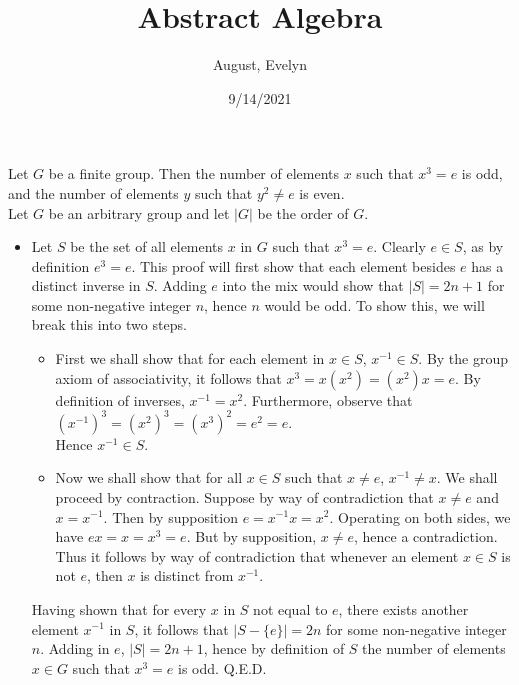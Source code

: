\documentclass{article}
\title{Abstract Algebra}
\author{August, Evelyn}
\date{9/14/2021}
\begin{document}
 Let $G$ be a finite group. Then the number of elements $x$ such that $x^3 = e$ is odd, and the number of elements $y$ such that $y^2 \ne e$ is even.\\

 Let $G$ be an arbitrary group and let $|G|$ be the order of $G$. 
\begin{itemize}
    \item Let $S$ be the set of all elements $x$ in $G$ such that $x^3 = e$. Clearly $e\in S$, as by definition $e^3 = e$. This proof will first show that each element besides $e$ has a distinct inverse in $S$. Adding $e$ into the mix would show that $|S| = 2n + 1$ for some non-negative integer $n$, hence $n$ would be odd. To show this, we will break this into two steps.
    \begin{itemize}
        \item First we shall show that for each element in $x\in S$, $x^{-1}\in S$. By the group axiom of associativity, it follows that $x^3 = x(x^2) = (x^2)x= e.$ By definition of inverses, $x^{-1} = x^2$. Furthermore, observe that $(x^{-1})^3 = (x^2)^3 = (x^3)^2 = e^2 = e.$\\
        Hence $x^{-1}\in S$.\\
        \item Now we shall show that for all $x\in S$ such that $x \ne e$, $x^{-1} \ne x$. We shall proceed by contraction. Suppose by way of contradiction that $x \ne e$ and $x = x^{-1}.$ Then by supposition $e = x^{-1}x = x^2$. Operating on both sides, we have $ex = x = x^3 = e.$ But by supposition, $x \ne e$, hence a contradiction. Thus it follows by way of contradiction that whenever an element $x\in S$ is not $e$, then $x$ is distinct from $x^{-1}$.
    \end{itemize}
    Having shown that for every $x$ in $S$ not equal to $e$, there exists another element $x^{-1}$ in $S$, it follows that $|S- \{e\}| = 2n$ for some non-negative integer $n$. Adding in $e$, $|S| = 2n +1$, hence by definition of $S$ the number of elements $x\in G$ such that $x^3 = e$ is odd. Q.E.D.
    

\end{itemize}
\end{document}
